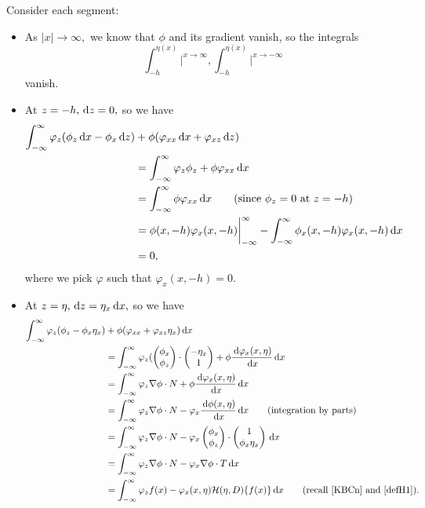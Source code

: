 \documentclass[11pt,reqno,oneside,a4paper]{article}
\begin{document}
Consider each segment:
\begin{itemize}
\item As $|x|\to \infty,$ we know that $\phi$ and its gradient vanish, so the integrals
\[  \int_{-h}^{\eta(x)} \bigg|^{x \to \infty}, \int^{\eta(x)}_{-h} \bigg|^{x \to -\infty}\]
vanish.
\item At $z = -h, \,\mathrm{d} z = 0,$ so we have 
\begin{align*}
\int^{\infty}_{-\infty}\varphi_z (\phi_z \,\mathrm{d} x - \phi_x \,\mathrm{d} z) &+ \phi(\varphi_{xx} \,\mathrm{d} x + \varphi_{xz} \,\mathrm{d} z) \\
&= \int^{\infty}_{-\infty}\varphi_z \phi_z + \phi \varphi_{xx} \,\mathrm{d} x \\
&= \int^{\infty}_{-\infty} \phi \varphi_{xx} \,\mathrm{d} x \qquad \text{(since $\phi_z=0$ at $z =-h$)} \\
&= \phi(x,-h) \varphi_x(x, -h) \bigg|^{\infty}_{-\infty} - \int^{\infty}_{-\infty} \phi_x(x,-h)\varphi_x(x,-h) \,\mathrm{d} x \\
&= 0,
\end{align*}
where we pick $\varphi$ such that $\varphi_x(x, -h) = 0.$
\item At $z = \eta, \,\mathrm{d} z = \eta_x \,\mathrm{d} x,$ so we have 
\begin{align*}
\int_{-\infty}^{\infty} \varphi_z(\phi_z - \phi_x \eta_x ) &+ \phi(\varphi_{xx}  +  \varphi_{xz} \eta_x) \,\mathrm{d} x \\
&= \int_{-\infty}^{\infty} \varphi_z(\begin{pmatrix} \phi_x  \\ \phi_z \end{pmatrix}\cdot \begin{pmatrix} - \eta_x \\ 1 \end{pmatrix} + \phi \frac{\,\mathrm{d} \varphi_x(x, \eta)}{\,\mathrm{d} x} \,\mathrm{d} x \\
&= \int_{-\infty}^{\infty} \varphi_z \nabla \phi \cdot N+ \phi \dfrac{\,\mathrm{d} \varphi_x(x, \eta)}{\,\mathrm{d} x} \,\mathrm{d} x \\
&= \int_{-\infty}^{\infty} \varphi_z \nabla \phi \cdot N -\varphi_x \dfrac{\,\mathrm{d} \phi(x, \eta)}{\,\mathrm{d} x} \,\mathrm{d} x \qquad \text{(integration by parts)}\\
&= \int_{-\infty}^{\infty} \varphi_z \nabla \phi \cdot N -\varphi_x \begin{pmatrix} \phi_x  \\ \phi_z \end{pmatrix} \cdot \begin{pmatrix} 1 \\ \phi_x \eta_x \end{pmatrix} \,\mathrm{d} x \\
&= \int_{-\infty}^{\infty} \varphi_z \nabla \phi \cdot N -\varphi_x \nabla \phi \cdot T \,\mathrm{d} x \\
&= \int_{-\infty}^{\infty} \varphi_z f(x) -\varphi_x(x, \eta) \mathcal{H}( \eta, D)\{ f(x) \} \,\mathrm{d} x \qquad \text{(recall \eqref{KBCn} and \eqref{defH1})}. 
\end{align*}
\end{itemize}
\end{document}
